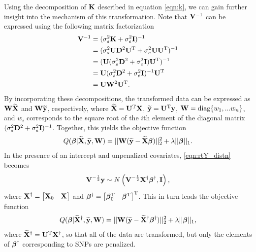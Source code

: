 Using the decomposition of $\mathbf{K}$ described in equation \eqref{eqn:k}, we can gain further insight into the mechanism of this transformation. Note that $\mathbf{V}^{-1}$ can be expressed using the following matrix factorization 
\begin{align*}
    \mathbf{V}^{-1} &= (\sigma^2_s \mathbf{K} + \sigma^2_e \mathbf{I})^{-1}\\
    &=(\sigma^2_s \mathbf{U} \mathbf{D}^2 \mathbf{U}^{\text{T}} + \sigma^2_e \mathbf{U} \mathbf{U}^{\text{T}})^{-1}\\
    &= (\mathbf{U} (\sigma^2_s \mathbf{D}^2 + \sigma^2_e \mathbf{I}) \mathbf{U}^{\text{T}})^{-1}\\
    &=\mathbf{U} (\sigma^2_s \mathbf{D}^2 + \sigma^2_e \mathbf{I})^{-1} \mathbf{U}^{\text{T}}\\
    &=\mathbf{U} \mathbf{W}^2 \mathbf{U}^{\text{T}}.
\end{align*}
By incorporating these decompositions, the transformed data can be expressed as $\mathbf{W} \widetilde{\mathbf{X}}$ and $\mathbf{W} \widetilde{\mathbf{y}}$, respectively, where $\widetilde{\mathbf{X}} = \mathbf{U}^{\text{T}} \mathbf{X}$, $\widetilde{\mathbf{y}} = \mathbf{U}^{\text{T}} \mathbf{y}$, $\mathbf{W} = \text{diag}\{w_1, ... w_n\}$, and $w_i$ corresponds to the square root of the $i$th element of the diagonal matrix $(\sigma^2_s \mathbf{D}^2 + \sigma^2_e \mathbf{I})^{-1}$. Together, this yields the objective function
\begin{equation}
\label{eqn:lmm_obj}
Q(\boldsymbol{\beta}{} | \widetilde{\mathbf{X}}, \widetilde{\mathbf{y}}, \mathbf{W}) = || \mathbf{W} (\widetilde{\mathbf{y}} - \widetilde{\mathbf{X}} \boldsymbol{\beta}{})||_2^2 + \lambda || \boldsymbol{\beta}{} ||_1.
\end{equation}
In the presence of an intercept and unpenalized covariates, \eqref{eqn:rtY_distn} becomes 
\begin{equation}
\mathbf{V}^{-\frac{1}{2}}\mathbf{y} \sim N\left(\mathbf{V}^{-\frac{1}{2}} \mathbf{X}{^\dagger} \boldsymbol{\beta}{}{^\dagger}, \mathbf{I} \right),
\end{equation}
where $\mathbf{X}{^\dagger} = \begin{bmatrix} \mathbf{X}_0 & \mathbf{X} \end{bmatrix}$ and $\boldsymbol{\beta}{}{^\dagger} = \begin{bmatrix} \boldsymbol{\beta}{}_0^{\text{T}} & \boldsymbol{\beta}{}^{\text{T}} \end{bmatrix}^{\text{T}}$. This in turn leads the objective function
\begin{equation}
Q(\boldsymbol{\beta}{} | \widetilde{\mathbf{X}}{^\dagger}, \widetilde{\mathbf{y}}, \mathbf{W}) = || \mathbf{W} (\widetilde{\mathbf{y}} - \widetilde{\mathbf{X}}{^\dagger} \boldsymbol{\beta}{}{^\dagger})||_2^2 + \lambda || \boldsymbol{\beta}{} ||_1,
\end{equation}
where $\widetilde{\mathbf{X}}{^\dagger} = \mathbf{U}^{\text{T}} \mathbf{X}{^\dagger}$, so that all of the data are transformed, but only the elements of $\boldsymbol{\beta}{}{^\dagger}$ corresponding to SNPs are penalized. 


